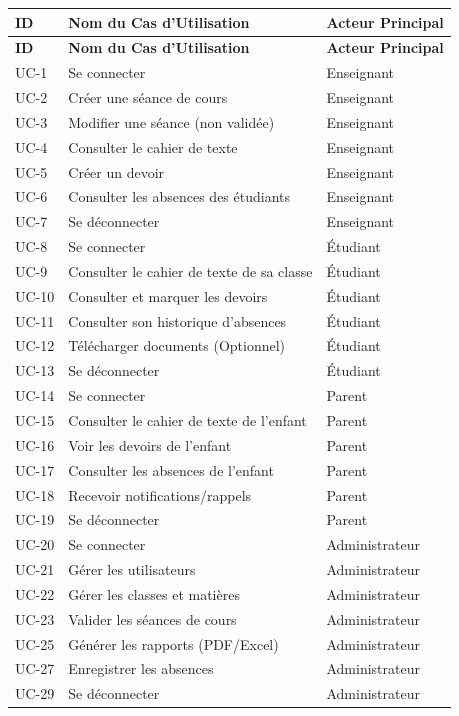 \documentclass[a4paper, 11pt]{article}
\begin{document}
\begin{xltabular}{\textwidth}{|l|X|l|}
\hline
\textbf{ID} & \textbf{Nom du Cas d'Utilisation} & \textbf{Acteur Principal} \\ \hline
\endfirsthead
\hline
\textbf{ID} & \textbf{Nom du Cas d'Utilisation} & \textbf{Acteur Principal} \\ \hline
\endhead
\hline
\endfoot
\hline
\endlastfoot

UC-1 & Se connecter & Enseignant \\ \hline
UC-2 & Créer une séance de cours & Enseignant \\ \hline
UC-3 & Modifier une séance (non validée) & Enseignant \\ \hline
UC-4 & Consulter le cahier de texte & Enseignant \\ \hline
UC-5 & Créer un devoir & Enseignant \\ \hline
UC-6 & Consulter les absences des étudiants & Enseignant \\ \hline
UC-7 & Se déconnecter & Enseignant \\ \hline

UC-8 & Se connecter & Étudiant \\ \hline
UC-9 & Consulter le cahier de texte de sa classe & Étudiant \\ \hline
UC-10 & Consulter et marquer les devoirs & Étudiant \\ \hline
UC-11 & Consulter son historique d'absences & Étudiant \\ \hline
UC-12 & Télécharger documents (Optionnel) & Étudiant \\ \hline
UC-13 & Se déconnecter & Étudiant \\ \hline

UC-14 & Se connecter & Parent \\ \hline
UC-15 & Consulter le cahier de texte de l'enfant & Parent \\ \hline
UC-16 & Voir les devoirs de l'enfant & Parent \\ \hline
UC-17 & Consulter les absences de l'enfant & Parent \\ \hline
UC-18 & Recevoir notifications/rappels & Parent \\ \hline
UC-19 & Se déconnecter & Parent \\ \hline

UC-20 & Se connecter & Administrateur \\ \hline
UC-21 & Gérer les utilisateurs & Administrateur \\ \hline
UC-22 & Gérer les classes et matières & Administrateur \\ \hline
UC-23 & Valider les séances de cours & Administrateur \\ \hline
UC-25 & Générer les rapports (PDF/Excel) & Administrateur \\ \hline
UC-27 & Enregistrer les absences & Administrateur \\ \hline
UC-29 & Se déconnecter & Administrateur \\ \hline


\end{xltabular}
\end{document}
